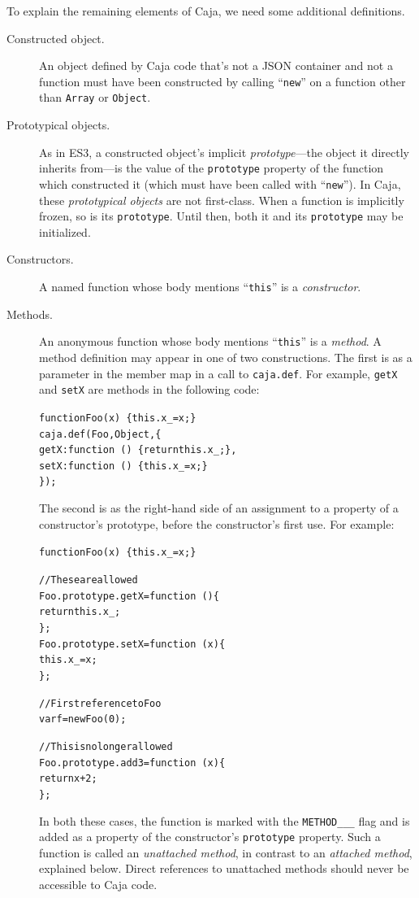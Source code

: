 \documentclass[letterpaper,twocolumn,10pt]{article}
\newcommand{\code}[1]{{\tt {#1}}}              %
\begin{document}
To explain the remaining elements of Caja, we need some additional 
definitions.

\begin{description}

  \item[Constructed object.] An object defined by Caja code that's not a JSON 
  container and not a function must have been constructed by calling 
  ``\code{new}'' on a function other than \code{Array} or \code{Object}.

  \item[Prototypical objects.] As in ES3, a constructed object's implicit \emph{prototype}---the object it directly 
  inherits from---is the value of the \code{prototype} property of the function which constructed it (which must 
  have been called with ``\code{new}''). In Caja, these \emph{prototypical objects} are not first-class. When a 
  function is implicitly frozen, so is its \code{prototype}. Until then, both it and its \code{prototype} may be 
  initialized.

  \item[Constructors.] A named function whose body mentions ``\code{this}'' 
  is a \emph{constructor}. 
    
  \item[Methods.] An anonymous function whose body mentions ``\code{this}'' 
  is a \emph{method}.  A method definition may appear in one of two constructions.
  The first is as a parameter in the member map in a call to \code{caja.def}.
  For example, \code{getX} and \code{setX} are methods in the following code:
\begin{alltt}
function Foo(x)\ \{ this.x_ = x; \}
caja.def(Foo, Object, \{
  getX:function\ ()\ \{ return this.x_; \},
  setX:function\ ()\ \{ this.x_ = x; \}
\});
\end{alltt}
  
  The second is as the right-hand side of an assignment to a property of a
  constructor's prototype, before the constructor's first use.  For example:
\begin{alltt}
function Foo(x)\ \{ this.x_ = x; \}

// These are allowed
Foo.prototype.getX = function\ ()\{ 
  return this.x_; 
\};
Foo.prototype.setX = function\ (x)\{ 
  this.x_ = x; 
\};

// First reference to Foo
var f = new Foo(0);

// This is no longer allowed
Foo.prototype.add3 = function\ (x)\{
  return x + 2;
\};
\end{alltt}
  In both these cases, the function is marked with the \code{METHOD\_\_\_} flag and is added as a property of the
  constructor's \code{prototype} property.  Such a function is called an \emph{unattached method}, in contrast
  to an \emph{attached method}, explained below. Direct references to unattached methods should never be accessible to Caja code.
  

\end{description}
\end{document}
